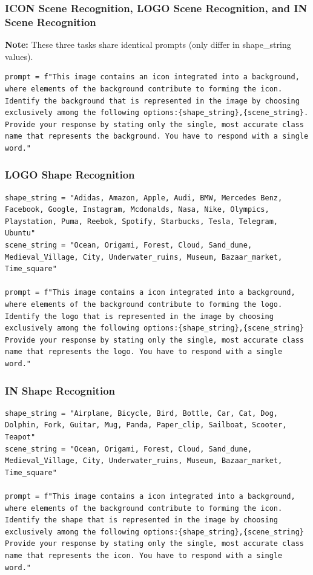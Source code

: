 \documentclass{article}
\theoremstyle{plain}
\theoremstyle{definition}
\theoremstyle{remark}
\begin{document}
\subsubsection{ICON Scene Recognition, LOGO Scene Recognition, and IN Scene Recognition}

\textbf{Note:} These three tasks share identical prompts (only differ in shape\_string values).

\begin{verbatim}
prompt = f"This image contains an icon integrated into a background,
where elements of the background contribute to forming the icon.
Identify the background that is represented in the image by choosing
exclusively among the following options:{shape_string},{scene_string}.
Provide your response by stating only the single, most accurate class
name that represents the background. You have to respond with a single
word."
\end{verbatim}

\subsubsection{LOGO Shape Recognition}

\begin{verbatim}
shape_string = "Adidas, Amazon, Apple, Audi, BMW, Mercedes Benz,
Facebook, Google, Instagram, Mcdonalds, Nasa, Nike, Olympics,
Playstation, Puma, Reebok, Spotify, Starbucks, Tesla, Telegram, Ubuntu"
scene_string = "Ocean, Origami, Forest, Cloud, Sand_dune,
Medieval_Village, City, Underwater_ruins, Museum, Bazaar_market,
Time_square"

prompt = f"This image contains a icon integrated into a background,
where elements of the background contribute to forming the logo.
Identify the logo that is represented in the image by choosing
exclusively among the following options:{shape_string},{scene_string}
Provide your response by stating only the single, most accurate class
name that represents the logo. You have to respond with a single word."
\end{verbatim}

\subsubsection{IN Shape Recognition}

\begin{verbatim}
shape_string = "Airplane, Bicycle, Bird, Bottle, Car, Cat, Dog,
Dolphin, Fork, Guitar, Mug, Panda, Paper_clip, Sailboat, Scooter,
Teapot"
scene_string = "Ocean, Origami, Forest, Cloud, Sand_dune,
Medieval_Village, City, Underwater_ruins, Museum, Bazaar_market,
Time_square"

prompt = f"This image contains a icon integrated into a background,
where elements of the background contribute to forming the icon.
Identify the shape that is represented in the image by choosing
exclusively among the following options:{shape_string},{scene_string}
Provide your response by stating only the single, most accurate class
name that represents the icon. You have to respond with a single word."
\end{verbatim}
\end{document}
